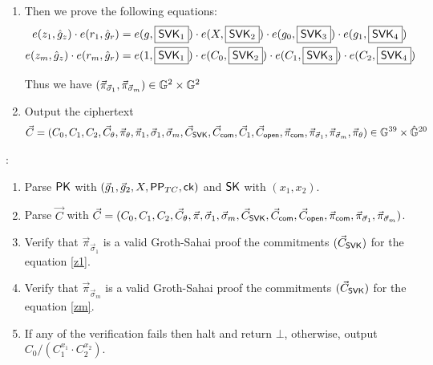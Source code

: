 \begin{description}
\begin{enumerate}
  \item Then we prove the following equations:
    \begin{align}
      e(z_1, \hat{g}_z) \cdot e(r_1, \hat{g}_r) &= e(g, \boxed{\mathsf{SVK}_1}) \cdot e(X, \boxed{\mathsf{SVK}_2}) \cdot e(g_0, \boxed{\mathsf{SVK}_3}) \cdot e(g_1, \boxed{\mathsf{SVK}_4}) \label{z1}\\
      e(z_m, \hat{g}_z) \cdot e(r_m, \hat{g}_r) &= e(1, \boxed{\mathsf{SVK}_1}) \cdot e(C_0, \boxed{\mathsf{SVK}_2}) \cdot e(C_1, \boxed{\mathsf{SVK}_3}) \cdot e(C_2, \boxed{\mathsf{SVK}_4}) \label{zm}
    \end{align}

    Thus we have $(\vec{\pi}_{\vec{\sigma}_1}, \vec{\pi}_{\vec{\sigma}_m}) \in \mathbb{G}^2 \times \mathbb{G}^2$
  
  \item Output the ciphertext
    \begin{align*}
      \vec{C} = (C_0, C_1, C_2, \vec{C}_{\theta}, \vec{\pi}_{\theta}, \vec{\pi}_{1}, \vec{\sigma}_1, \vec{\sigma}_m, \vec{C}_{\mathsf{SVK}}, \vec{C}_{\mathsf{com}}, \vec{C}_1, \vec{C}_{\mathsf{open}},  \vec{\pi}_{\mathsf{com}}, \vec{\pi}_{\vec{\sigma}_1}, \vec{\pi}_{\vec{\sigma}_m}, \vec{\pi}_{\theta}) \in \mathbb{G}^{39} \times \hat{\mathbb{G}}^{20}
    \end{align*}
    

    
  \end{enumerate}
  
\item[\boldmath{$RCCA2.\Dec(\PK, \vec{C}, \SK)$}]:
  \begin{enumerate}
  \item Parse $\mathsf{PK}$ with $(\vec{g}_1, \vec{g}_2, X, \mathsf{PP}_{TC}, \mathsf{ck})$ and $\mathsf{SK}$ with $(x_1, x_2)$.
  \item Parse $\vec{C}$ with $\vec{C} = (C_0, C_1, C_2, \vec{C}_{\theta}, \vec{\pi}, \vec{\sigma}_1, \vec{\sigma}_m, \vec{C}_{\mathsf{SVK}}, \vec{C}_{\mathsf{com}}, \vec{C}_{\mathsf{open}},  \vec{\pi}_{\mathsf{com}}, \vec{\pi}_{\vec{\sigma}_1}, \vec{\pi}_{\vec{\sigma}_m})$.
  \item Verify that $\vec{\pi}_{\vec{\sigma}_1}$ is a valid Groth-Sahai proof \wrt the commitments $(\vec{C}_{\mathsf{SVK}})$ for the equation \ref{z1}.
  \item Verify that $\vec{\pi}_{\vec{\sigma}_m}$ is a valid Groth-Sahai proof \wrt the commitments $(\vec{C}_{\mathsf{SVK}})$ for the equation \ref{zm}.
  \item If any of the verification fails then halt and return $\bot$, otherwise, output $C_0/(C_1^{x_1}\cdot C_2^{x_2})$.
  \end{enumerate}



\end{description}
